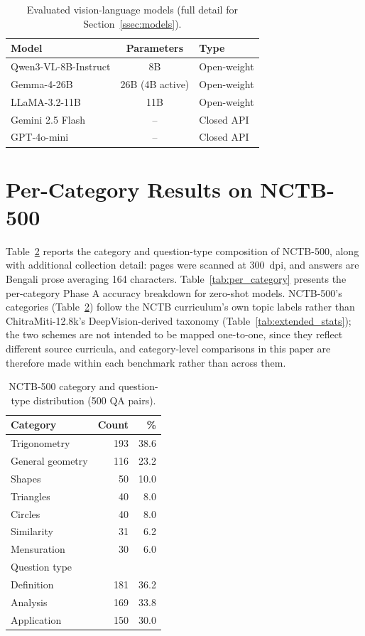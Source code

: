 \documentclass[11pt]{article}
\begin{document}
\begin{table}[t]
\centering\small
\begin{tabular}{lcl}
\toprule
\textbf{Model} & \textbf{Parameters} & \textbf{Type} \\
\midrule
Qwen3-VL-8B-Instruct & 8B & Open-weight \\
Gemma-4-26B & 26B (4B active) & Open-weight \\
LLaMA-3.2-11B & 11B & Open-weight \\
Gemini 2.5 Flash & -- & Closed API \\
GPT-4o-mini & -- & Closed API \\
\bottomrule
\end{tabular}
\caption{Evaluated vision-language models (full detail for Section~\ref{ssec:models}).}
\label{tab:models}
\end{table}

\section{Per-Category Results on NCTB-500}
\label{app:per_category}

Table~\ref{tab:nctb_dist} reports the category and question-type composition of NCTB-500, along with additional collection detail: pages were scanned at 300~dpi, and answers are Bengali prose averaging 164 characters. Table~\ref{tab:per_category} presents the per-category Phase A accuracy breakdown for zero-shot models. NCTB-500's categories (Table~\ref{tab:nctb_dist}) follow the NCTB curriculum's own topic labels rather than ChitraMiti-12.8k's DeepVision-derived taxonomy (Table~\ref{tab:extended_stats}); the two schemes are not intended to be mapped one-to-one, since they reflect different source curricula, and category-level comparisons in this paper are therefore made within each benchmark rather than across them.

\begin{table}[t]
\centering
\caption{NCTB-500 category and question-type distribution (500 QA pairs).}
\label{tab:nctb_dist}
\small
\begin{tabular}{lrr}
\toprule
\textbf{Category} & \textbf{Count} & \textbf{\%} \\
\midrule
Trigonometry    & 193 & 38.6 \\
General geometry & 116 & 23.2 \\
Shapes          & \phantom{0}50 & 10.0 \\
Triangles       & \phantom{0}40 & \phantom{0}8.0 \\
Circles         & \phantom{0}40 & \phantom{0}8.0 \\
Similarity      & \phantom{0}31 & \phantom{0}6.2 \\
Mensuration     & \phantom{0}30 & \phantom{0}6.0 \\
\midrule
\multicolumn{2}{l}{Question type} & \\
\midrule
Definition   & 181 & 36.2 \\
Analysis     & 169 & 33.8 \\
Application  & 150 & 30.0 \\
\bottomrule
\end{tabular}
\end{table}
\end{document}
